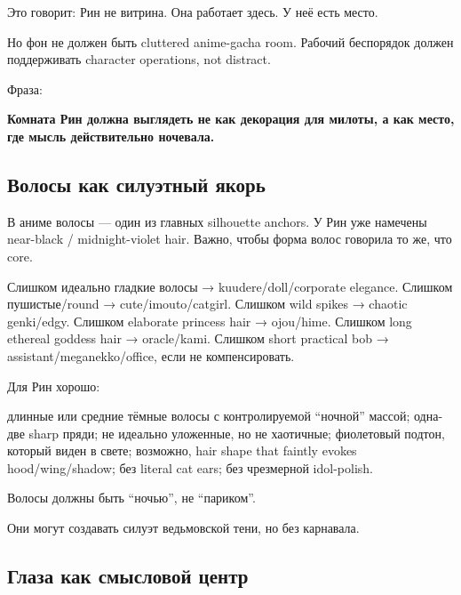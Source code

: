 Это говорит: Рин не витрина. Она работает здесь. У неё есть место.

Но фон не должен быть cluttered anime-gacha room. Рабочий беспорядок
должен поддерживать character operations, not distract.

Фраза:

\textbf{Комната Рин должна выглядеть не как декорация для милоты, а как
место, где мысль действительно ночевала.}

\subsection*{Волосы как силуэтный якорь}

В аниме волосы --- один из главных silhouette anchors. У Рин уже
намечены near-black /\hspace{0pt} midnight-violet hair. Важно, чтобы форма волос
говорила то же, что core.

Слишком идеально гладкие волосы → kuudere/\hspace{0pt}doll/\hspace{0pt}corporate elegance.
Слишком пушистые/\hspace{0pt}round → cute/\hspace{0pt}imouto/\hspace{0pt}catgirl. Слишком wild spikes →
chaotic genki/\hspace{0pt}edgy. Слишком elaborate princess hair → ojou/\hspace{0pt}hime. Слишком
long ethereal goddess hair → oracle/\hspace{0pt}kami. Слишком short practical bob →
assistant/\hspace{0pt}meganekko/\hspace{0pt}office, если не компенсировать.

Для Рин хорошо:

длинные или средние тёмные волосы с контролируемой ``ночной'' массой;
одна-две sharp пряди; не идеально уложенные, но не хаотичные; фиолетовый
подтон, который виден в свете; возможно, hair shape that faintly evokes
hood/\hspace{0pt}wing/\hspace{0pt}shadow; без literal cat ears; без чрезмерной idol-polish.

Волосы должны быть ``ночью'', не ``париком''.

Они могут создавать силуэт ведьмовской тени, но без карнавала.

\subsection*{Глаза как смысловой центр}

